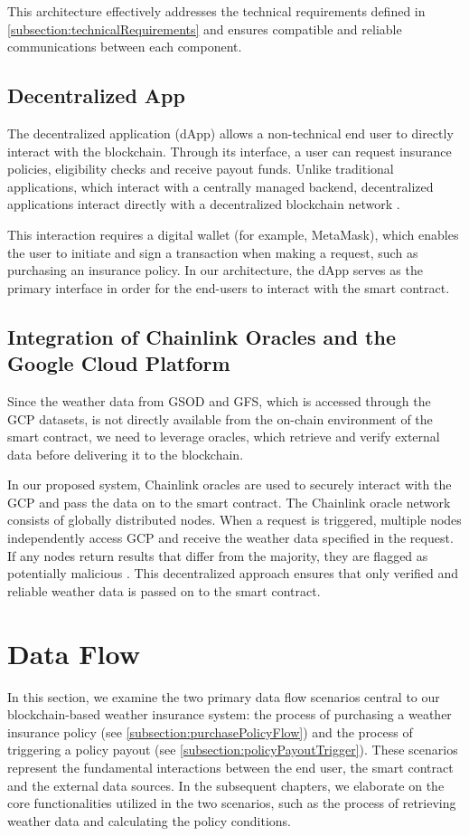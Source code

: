 This architecture effectively addresses the technical requirements defined in \cref{subsection:technicalRequirements} and ensures compatible and reliable communications between each component.

\subsection{Decentralized App}\label{subsection:decentralizedApp}
The decentralized application (dApp) allows a non-technical end user to directly interact with the blockchain. Through its interface, a user can request insurance policies, eligibility checks and receive payout funds. Unlike traditional applications, which interact with a centrally managed backend, decentralized applications interact directly with a decentralized blockchain network \autocite{Wu2019A}.

This interaction requires a digital wallet (for example, MetaMask), which enables the user to initiate and sign a transaction when making a request, such as purchasing an insurance policy. In our architecture, the dApp serves as the primary interface in order for the end-users to interact with the smart contract. 

\subsection{Integration of Chainlink Oracles and the Google Cloud Platform}\label{subsection:ChainlinkOracle}
Since the weather data from GSOD and GFS, which is accessed through the GCP datasets, is not directly available from the on-chain environment of the smart contract, we need to leverage oracles, which retrieve and verify external data before delivering it to the blockchain.

In our proposed system, Chainlink oracles are used to securely interact with the GCP and pass the data on to the smart contract. The Chainlink oracle network consists of globally distributed nodes. When a request is triggered, multiple nodes independently access GCP and receive the weather data specified in the request. If any nodes return results that differ from the majority, they are flagged as potentially malicious \autocite{goswami2022towards}. This decentralized approach ensures that only verified and reliable weather data is passed on to the smart contract.

\section{Data Flow}
In this section, we examine the two primary data flow scenarios central to our blockchain-based weather insurance system: the process of purchasing a weather insurance policy (see \cref{subsection:purchasePolicyFlow}) and the process of triggering a policy payout (see \cref{subsection:policyPayoutTrigger}). These scenarios represent the fundamental interactions between the end user, the smart contract and the external data sources. In the subsequent chapters, we elaborate on the core functionalities utilized in the two scenarios, such as the process of retrieving weather data and calculating the policy conditions.

